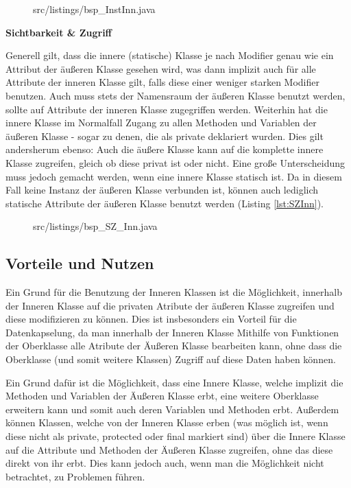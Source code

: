\begin{figure}[hbt]
\lstset{language=Java}
 {src/listings/bsp_InstInn.java}
\end{figure}


{\bf Sichtbarkeit \& Zugriff}

Generell gilt, dass die innere (statische) Klasse je nach Modifier genau wie ein Attribut der äußeren Klasse gesehen wird, was dann implizit auch für alle Attribute der inneren Klasse gilt, falls diese einer weniger starken Modifier benutzen.
Auch muss stets der Namensraum der äußeren Klasse benutzt werden, sollte auf Attribute der inneren Klasse zugegriffen werden.
Weiterhin hat die innere Klasse im Normalfall Zugang zu allen Methoden und Variablen der äußeren Klasse - sogar zu denen, die als private deklariert wurden.
Dies gilt andersherum ebenso: Auch die äußere Klasse kann auf die komplette innere Klasse zugreifen, gleich ob diese privat ist oder nicht.
Eine große Unterscheidung muss jedoch gemacht werden, wenn eine innere Klasse statisch ist. Da in diesem Fall keine Instanz der äußeren Klasse verbunden ist, können auch lediglich statische Attribute der äußeren Klasse benutzt werden (Listing \ref{lst:SZInn}).

\begin{figure}[hbt]
\lstset{language=Java}
 {src/listings/bsp_SZ_Inn.java}
\end{figure}


\subsection{Vorteile und Nutzen}

Ein Grund für die Benutzung der Inneren Klassen ist die Möglichkeit, innerhalb der Inneren Klasse auf die privaten Atribute der äußeren Klasse zugreifen und diese modifizieren zu können.
Dies ist insbesonders ein Vorteil für die Datenkapselung, da man innerhalb der Inneren Klasse Mithilfe von Funktionen der Oberklasse alle Atribute der Äußeren Klasse bearbeiten kann, ohne dass die Oberklasse (und somit weitere Klassen) Zugriff auf diese Daten haben können.

Ein Grund dafür ist die Möglichkeit, dass eine Innere Klasse, welche implizit die Methoden und Variablen der Äußeren Klasse erbt, eine weitere Oberklasse erweitern kann und somit auch deren Variablen und Methoden erbt.
Außerdem können Klassen, welche von der Inneren Klasse erben (was möglich ist, wenn diese nicht als private, protected oder final markiert sind) über die Innere Klasse auf die Attribute und Methoden der Äußeren Klasse zugreifen, ohne das diese direkt von ihr erbt. Dies kann jedoch auch, wenn man die Möglichkeit nicht betrachtet, zu Problemen führen.

